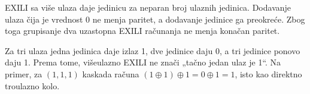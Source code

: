 
EXILI sa više ulaza daje jedinicu za neparan broj ulaznih jedinica. Dodavanje ulaza čija je vrednost 0 ne menja paritet, a dodavanje jedinice ga preokreće. Zbog toga grupisanje dva uzastopna EXILI računanja ne menja konačan paritet.

Za tri ulaza jedna jedinica daje izlaz 1, dve jedinice daju 0, a tri jedinice ponovo daju 1. Prema tome, višeulazno EXILI ne znači „tačno jedan ulaz je 1“. Na primer, za \((1,1,1)\) kaskada računa \((1\oplus1)\oplus1=0\oplus1=1\), isto kao direktno troulazno kolo.

